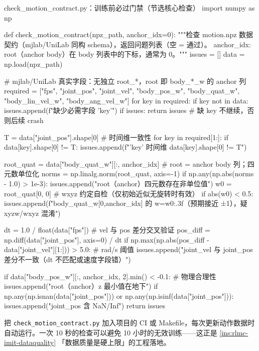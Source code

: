 \begin{codebox}[Python]{check\_motion\_contract.py：训练前必过门禁（节选核心检查）}
import numpy as np

def check_motion_contract(npz_path, anchor_idx=0):
    """检查 motion.npz 数据契约（mjlab/UniLab 同构 schema），返回问题列表（空 = 通过）。
    anchor_idx: root（anchor body）在 body 列表中的下标，通常为 0。"""
    issues = []
    data = np.load(npz_path)

    # mjlab/UniLab 真实字段：无独立 root_*，root 即 body_*_w 的 anchor 列
    required = ["fps", "joint_pos", "joint_vel",
                "body_pos_w", "body_quat_w", "body_lin_vel_w", "body_ang_vel_w"]
    for key in required:
        if key not in data:
            issues.append(f"缺少必需字段 '{key}'")
    if issues:
        return issues                               # 缺 key 不继续，否则后续 crash

    T = data["joint_pos"].shape[0]                   # 时间维一致性
    for key in required[1:]:
        if data[key].shape[0] != T:
            issues.append(f"'{key}' 时间维 {data[key].shape[0]} != {T}")

    root_quat = data["body_quat_w"][:, anchor_idx]   # root = anchor body 列；四元数单位化
    norms = np.linalg.norm(root_quat, axis=-1)
    if np.any(np.abs(norms - 1.0) > 1e-3):
        issues.append("root（anchor）四元数存在非单位值")
    w0 = root_quat[0, 0]                             # wxyz 约定自检（仅初始近似无旋转时有效）
    if abs(w0) < 0.5:
        issues.append(f"body_quat_w[0,{anchor_idx}] 的 w={w0:.3f}（预期接近 ±1），疑 xyzw/wxyz 混淆")

    dt = 1.0 / float(data["fps"])                    # vel 与 pos 差分交叉验证
    pos_diff = np.diff(data["joint_pos"], axis=0) / dt
    if np.max(np.abs(pos_diff - data["joint_vel"][1:])) > 5.0:   # rad/s 阈值
        issues.append("joint_vel 与 joint_pos 差分不一致（dt 不匹配或速度字段错）")

    if data["body_pos_w"][:, anchor_idx, 2].min() < -0.1:   # 物理合理性
        issues.append("root（anchor）z 最小值在地下")
    if np.any(np.isnan(data["joint_pos"])) or np.any(np.isinf(data["joint_pos"])):
        issues.append("joint_pos 含 NaN/Inf")
    return issues
\end{codebox}

\begin{note}[把契约检查加入 CI]
把 \verb|check_motion_contract.py| 加入项目的 CI 或 Makefile，每次更新动作数据时自动运行。一次 10 秒的检查可以避免 10 小时的无效训练——这正是 \cref{ins:rlmc-imit-dataquality} 「数据质量是硬上限」的工程落地。
\end{note}

